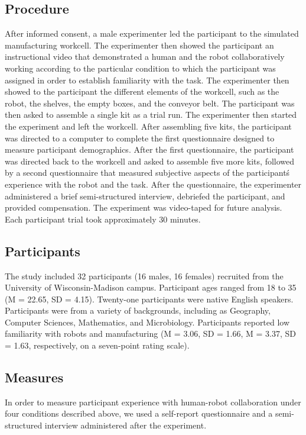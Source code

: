 \subsection{Procedure}
       After informed consent, a male experimenter led the participant to the simulated manufacturing workcell. The experimenter then showed the participant an instructional video that demonstrated a human and the robot collaboratively working according to the particular condition to which the participant was assigned in order to establish familiarity with the task. The experimenter then showed to the participant the different elements of the workcell, such as the robot, the shelves, the empty boxes, and the conveyor belt. The participant was then asked to assemble a single kit as a trial run. The experimenter then started the experiment and left the workcell. After assembling five kits, the participant was directed to a computer to complete the first questionnaire designed to measure participant demographics. After the first questionnaire,  the participant was directed back to the workcell and asked to assemble five more kits, followed by a second questionnaire that measured subjective aspects of the participant\' s experience with the robot and the task. After the questionnaire, the experimenter administered a brief semi-structured interview, debriefed the participant, and provided compensation. The experiment was video-taped for future analysis. Each participant trial took approximately 30 minutes.
\subsection{Participants}
       The study included 32 participants (16 males, 16 females) recruited from the University of Wisconsin-Madison campus. Participant ages ranged from 18 to 35 (M = 22.65, SD = 4.15).
Twenty-one participants were native English speakers. Participants were from a variety of backgrounds, including as Geography, Computer Sciences, Mathematics, and Microbiology. Participants reported low familiarity with robots and manufacturing (M = 3.06, SD = 1.66, M = 3.37, SD = 1.63, respectively, on a seven-point rating scale).
\subsection{Measures}
       In order to measure participant experience with human-robot collaboration under four conditions described above, we used a self-report questionnaire and a semi-structured interview administered after the experiment.
